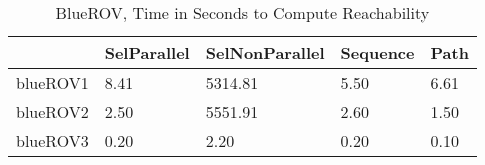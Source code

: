 \begin{table}
\centering
\caption{BlueROV, Time in Seconds to Compute Reachability}
\label{ROV_states_time}
\begin{tabular}{lllll}
\toprule
{} & SelParallel & SelNonParallel & Sequence &  Path \\
\midrule
blueROV1 &        8.41 &        5314.81 &     5.50 &  6.61 \\
blueROV2 &        2.50 &        5551.91 &     2.60 &  1.50 \\
blueROV3 &        0.20 &           2.20 &     0.20 &  0.10 \\
\bottomrule
\end{tabular}
\end{table}
